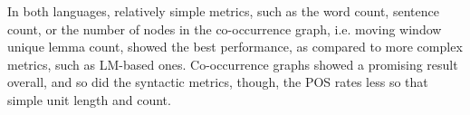 In both languages, relatively simple metrics, such as the word count, sentence count, or the number of nodes in the co-occurrence graph, i.e. moving window unique lemma count, showed the best performance, as compared to more complex metrics, such as LM-based ones. Co-occurrence graphs showed a promising result overall, and so did the syntactic metrics, though, the POS rates less so that simple unit length and count.